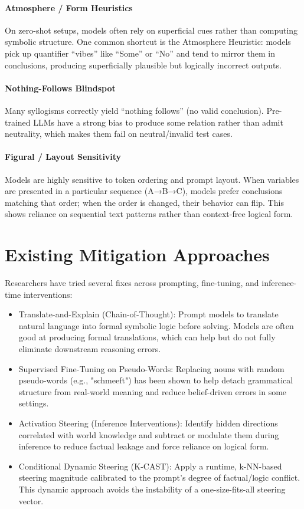 \documentclass[11pt]{article}
\begin{document}
\paragraph{Atmosphere / Form Heuristics}
On zero-shot setups, models often rely on superficial cues rather than computing symbolic structure. One common shortcut is the Atmosphere Heuristic: models pick up quantifier ``vibes'' like ``Some'' or ``No'' and tend to mirror them in conclusions, producing superficially plausible but logically incorrect outputs.

\paragraph{Nothing-Follows Blindspot}
Many syllogisms correctly yield ``nothing follows'' (no valid conclusion). Pre-trained LLMs have a strong bias to produce some relation rather than admit neutrality, which makes them fail on neutral/invalid test cases.

\paragraph{Figural / Layout Sensitivity}
Models are highly sensitive to token ordering and prompt layout. When variables are presented in a particular sequence (A→B→C), models prefer conclusions matching that order; when the order is changed, their behavior can flip. This shows reliance on sequential text patterns rather than context-free logical form.

\section{Existing Mitigation Approaches}

Researchers have tried several fixes across prompting, fine-tuning, and inference-time interventions:

\begin{itemize}
	\item Translate-and-Explain (Chain-of-Thought): Prompt models to translate natural language into formal symbolic logic before solving. Models are often good at producing formal translations, which can help but do not fully eliminate downstream reasoning errors.
	\item Supervised Fine-Tuning on Pseudo-Words: Replacing nouns with random pseudo-words (e.g., "schmeeft") has been shown to help detach grammatical structure from real-world meaning and reduce belief-driven errors in some settings.
	\item Activation Steering (Inference Interventions): Identify hidden directions correlated with world knowledge and subtract or modulate them during inference to reduce factual leakage and force reliance on logical form.
	\item Conditional Dynamic Steering (K-CAST): Apply a runtime, k-NN-based steering magnitude calibrated to the prompt's degree of factual/logic conflict. This dynamic approach avoids the instability of a one-size-fits-all steering vector.
\end{itemize}
\end{document}
